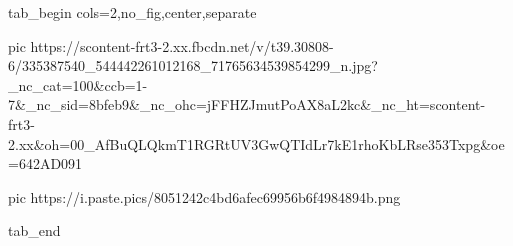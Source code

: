  
 
 
 
 

\ifcmt
  tab_begin cols=2,no_fig,center,separate

  pic https://scontent-frt3-2.xx.fbcdn.net/v/t39.30808-6/335387540_544442261012168_71765634539854299_n.jpg?_nc_cat=100&ccb=1-7&_nc_sid=8bfeb9&_nc_ohc=jFFHZJmutPoAX8aL2kc&_nc_ht=scontent-frt3-2.xx&oh=00_AfBuQLQkmT1RGRtUV3GwQTIdLr7kE1rhoKbLRse353Txpg&oe=642AD091

	pic https://i.paste.pics/8051242c4bd6afec69956b6f4984894b.png

  tab_end
\fi
